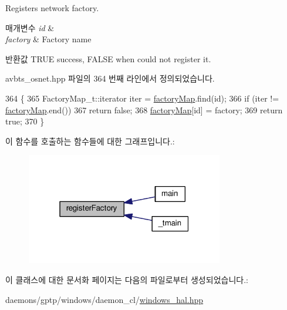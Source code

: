 Registers network factory. 


\begin{DoxyParams}{매개변수}
{\em id} & \\
\hline
{\em factory} & Factory name \\
\hline
\end{DoxyParams}
\begin{DoxyReturn}{반환값}
T\+R\+UE success, F\+A\+L\+SE when could not register it. 
\end{DoxyReturn}


avbts\+\_\+osnet.\+hpp 파일의 364 번째 라인에서 정의되었습니다.


\begin{DoxyCode}
364                                                              \{
365         FactoryMap\_t::iterator iter = \hyperlink{class_o_s_network_interface_factory_a60237a7c73ac326584618193523c9350}{factoryMap}.find(\textcolor{keywordtype}{id});
366         \textcolor{keywordflow}{if} (iter != \hyperlink{class_o_s_network_interface_factory_a60237a7c73ac326584618193523c9350}{factoryMap}.end())
367             \textcolor{keywordflow}{return} \textcolor{keyword}{false};
368         \hyperlink{class_o_s_network_interface_factory_a60237a7c73ac326584618193523c9350}{factoryMap}[id] = factory;
369         \textcolor{keywordflow}{return} \textcolor{keyword}{true};
370     \}
\end{DoxyCode}


이 함수를 호출하는 함수들에 대한 그래프입니다.\+:
\nopagebreak
\begin{figure}[H]
\begin{center}
\leavevmode
\includegraphics[width=244pt]{class_o_s_network_interface_factory_a31c35b66fcf0061135c152be8e602acd_icgraph}
\end{center}
\end{figure}




이 클래스에 대한 문서화 페이지는 다음의 파일로부터 생성되었습니다.\+:\begin{DoxyCompactItemize}
\item 
daemons/gptp/windows/daemon\+\_\+cl/\hyperlink{windows__hal_8hpp}{windows\+\_\+hal.\+hpp}\end{DoxyCompactItemize}

